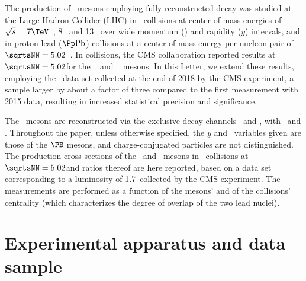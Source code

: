 The production of \PB\ mesons employing fully reconstructed decay was studied at the Large Hadron Collider (LHC) in \pp\ collisions at center-of-mass energies of $\sqrts = 7\TeV$~\cite{CMSBmesonpp,Chatrchyan:2011pw,Chatrchyan:2011vh,ATLAS:2013cia,LHCb:2013JHEP,Aaij:2014hla,Aaij:2012dd}, 8\TeV~\cite{Aaij:2015fea,Aaij:2014ija} and 13\TeV~\cite{Khachatryan:2016csy} over wide momentum (\pt) and rapidity ($y$) intervals, and in proton-lead ($\pPb$) collisions at a center-of-mass energy per nucleon pair of $\sqrtsNN = 5.02$\TeV~\cite{Khachatryan:2015uja}. In \PbPb collisions, the CMS collaboration reported results at $\sqrtsNN = 5.02$\TeV for the \PBp~\cite{BpPbPbCMS} and \PBzs~\cite{BsPbPbCMS} mesons.
%
In this Letter, we extend these results, employing the \PbPb\ data set collected at the end of 2018 by the CMS experiment, a sample larger by about a factor of three compared to the first measurement with 2015 data, resulting in increased statistical precision and significance.  

The \PB\ mesons are reconstructed via the exclusive decay channels \Bzerosdecay\ and \Bplusdecay, with \Jpsidecay\ and \phidecay.
Throughout the paper, unless otherwise specified, the $y$ and \pt\ variables given are those of the $\PB$ mesons, and charge-conjugated particles are not distinguished. The production cross sections of the \PBzs\ and \PBp\ mesons in \PbPb\ collisions at $\sqrtsNN = 5.02$\TeV and ratios thereof are here reported, based on a data set corresponding to a luminosity of 1.7\nbinv\ collected by the CMS experiment.
The measurements are performed as a function of the mesons' \pt and of the \PbPb collisions' centrality (which characterizes the degree of overlap of the two lead nuclei).

\section{Experimental apparatus and data sample}

